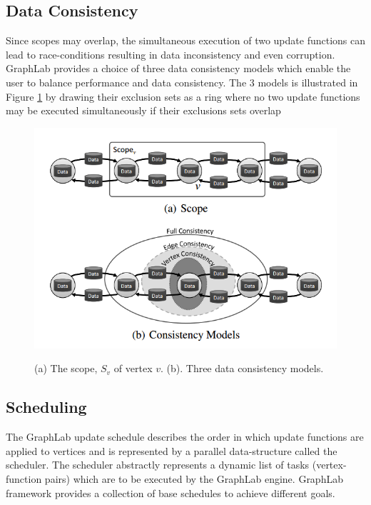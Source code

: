 \documentclass {article}
\begin{document}
\subsection{Data Consistency}
Since scopes may overlap, the simultaneous execution of
two update functions can lead to race-conditions resulting
in data inconsistency and even corruption. GraphLab provides
 a choice of three data consistency models which enable the user
  to balance performance and data consistency. The 3 models is illustrated in Figure \ref{graphlab_scope}
   by drawing their exclusion sets as a ring where no two update functions
    may be executed simultaneously if their exclusions sets overlap
\begin{figure}
  \centering
  \includegraphics[width=\textwidth]{graphlab_scope}\\
  \caption{(a) The scope, $S_v$ of vertex $v$. (b). Three data consistency
   models.}\label{graphlab_scope}
\end{figure}



\subsection{Scheduling}
The GraphLab update schedule describes the order in
which update functions are applied to vertices and is represented by a parallel data-structure called the scheduler.
The scheduler abstractly represents a dynamic list of tasks
(vertex-function pairs) which are to be executed by the
GraphLab engine. GraphLab framework provides a collection of base schedules to achieve different goals.
\end{document}
